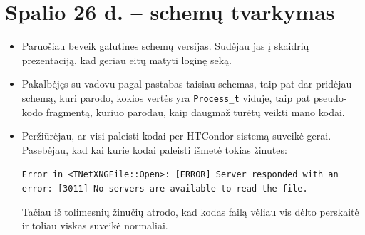\documentclass[a4paper, 12pt]{article}
\newcommand{\ttt}[1]{\texttt{#1}}
\begin{document}
\section{Spalio 26 d. -- schemų tvarkymas}
\begin{itemize}
	\item Paruošiau beveik galutines schemų versijas. Sudėjau jas į skaidrių prezentaciją,
	kad geriau eitų matyti loginę seką.
	\item Pakalbėjęs su vadovu pagal pastabas taisiau schemas, taip pat dar pridėjau
	schemą, kuri parodo, kokios vertės yra \ttt{Process\_t} viduje, taip pat pseudo-kodo
	fragmentą, kuriuo parodau, kaip daugmaž turėtų veikti mano kodai.
	
	\item Peržiūrėjau, ar visi paleisti kodai per HTCondor sistemą suveikė gerai.
	Pasebėjau, kad kai kurie kodai paleisti išmetė tokias žinutes:
	
	\ttt{Error in <TNetXNGFile::Open>: [ERROR] Server responded with an error:
	[3011] No servers are available to read the file.}
	
	Tačiau iš tolimesnių žinučių atrodo, kad kodas failą vėliau vis dėlto perskaitė
	ir toliau viskas suveikė normaliai.
\end{itemize}



\end{document}
